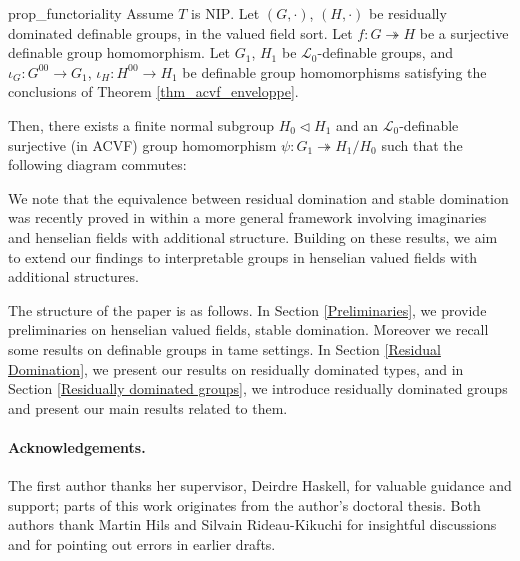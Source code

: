 \documentclass[12pt]{article}
\newcommand{\NIP}{\mathrm{NIP}}
\newcommand{\0}{\emptyset}
\theoremstyle{plain}%
\theoremstyle{definition}
\theoremstyle{remark}
\begin{document}
\begin{repprop}{prop_functoriality} Assume $T$ is $\NIP$. Let $(G, \cdot)$, $(H, \cdot)$ be residually dominated definable groups, in the valued field sort. Let $f: G \twoheadrightarrow H$ be a surjective definable group homomorphism. Let $G_1$, $H_1$ be $\mathcal{L}_0$-definable groups, and $\iota_G: G^{00} \rightarrow G_1$, $\iota_H: H^{00} \rightarrow H_1$ be definable group homomorphisms satisfying the conclusions of Theorem \ref{thm_acvf_enveloppe}.


Then, there exists a finite normal subgroup $H_0 \lhd H_1$ and an $\mathcal{L}_0$-definable surjective (in ACVF) group homomorphism $\psi: G_1 \twoheadrightarrow H_1 / H_0$ such that the following diagram commutes:

\begin{center}
\end{center}

\end{repprop}

We note that the equivalence between residual domination and stable domination was recently proved in \cite{KRV24} within a more general framework involving imaginaries and henselian fields with additional structure. Building on these results, we aim to extend our findings to interpretable groups in henselian valued fields with additional structures.

The structure of the paper is as follows. In Section \ref{Preliminaries}, we provide preliminaries on henselian valued fields, stable domination. Moreover we recall some results on definable groups in tame settings. In Section \ref{Residual Domination}, we present our results on residually dominated types, and in Section \ref{Residually dominated groups}, we introduce residually dominated groups and present our main results related to them.

\paragraph{Acknowledgements.}
The first author thanks her supervisor, Deirdre Haskell, for valuable guidance and support; parts of this work originates from the author’s doctoral thesis. Both authors thank Martin Hils and Silvain Rideau-Kikuchi for insightful discussions and for pointing out errors in earlier drafts.
\end{document}
